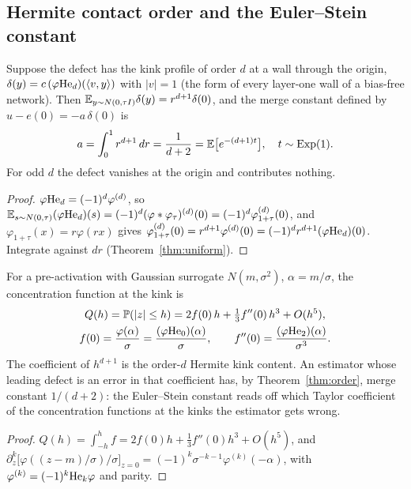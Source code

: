 \subsection{Hermite contact order and the Euler--Stein constant}
\begin{theorem}\label{thm:order}
Suppose the defect has the kink profile of order $d$ at a wall through the origin, $\delta(y)=c\,(\varphi\mathrm{He}_d)(\langle v,y\rangle)$
with $|v|=1$ (the form of every layer-one wall of a bias-free network). Then
$\mathbb E_{y\sim N(0,\tau I)}\delta(y)=r^{d+1}\delta(0)$, and the merge constant defined by $u-e(0)=-a\,\delta(0)$ is
\[
a=\int_0^1r^{d+1}\,dr=\frac1{d+2}=\mathbb E\big[e^{-(d+1)t}\big],\quad t\sim\mathrm{Exp}(1).
\]
For odd $d$ the defect vanishes at the origin and contributes nothing.
\end{theorem}
\begin{proof}
$\varphi\mathrm{He}_d=(-1)^d\varphi^{(d)}$, so $\mathbb E_{s\sim N(0,\tau)}(\varphi\mathrm{He}_d)(s)=(-1)^d(\varphi*\varphi_\tau)^{(d)}(0)=(-1)^d\varphi_{1+\tau}^{(d)}(0)$,
and $\varphi_{1+\tau}(x)=r\varphi(rx)$ gives $\varphi^{(d)}_{1+\tau}(0)=r^{d+1}\varphi^{(d)}(0)=(-1)^dr^{d+1}(\varphi\mathrm{He}_d)(0)$.
Integrate against $dr$ (Theorem~\ref{thm:uniform}).
\end{proof}

\begin{proposition}\label{prop:conc}
For a pre-activation with Gaussian surrogate $N(m,\sigma^2)$, $\alpha=m/\sigma$, the concentration function at the kink is
\begin{gather*}
Q(h)=\mathbb P(|z|\le h)=2f(0)\,h+\tfrac13f''(0)\,h^3+O(h^5),\\
f(0)=\frac{\varphi(\alpha)}\sigma=\frac{(\varphi\mathrm{He}_0)(\alpha)}{\sigma},\qquad
f''(0)=\frac{(\varphi\mathrm{He}_2)(\alpha)}{\sigma^3}.
\end{gather*}
The coefficient of $h^{d+1}$ is the order-$d$ Hermite kink content. An estimator whose leading defect is an error in
that coefficient has, by Theorem~\ref{thm:order}, merge constant $1/(d+2)$: the Euler--Stein constant reads off which
Taylor coefficient of the concentration functions at the kinks the estimator gets wrong.
\end{proposition}
\begin{proof}
$Q(h)=\int_{-h}^hf=2f(0)h+\tfrac13f''(0)h^3+O(h^5)$, and $\partial_z^k\big[\varphi((z-m)/\sigma)/\sigma\big]_{z=0}=
(-1)^k\sigma^{-k-1}\varphi^{(k)}(-\alpha)$, with $\varphi^{(k)}=(-1)^k\mathrm{He}_k\varphi$ and parity.
\end{proof}

